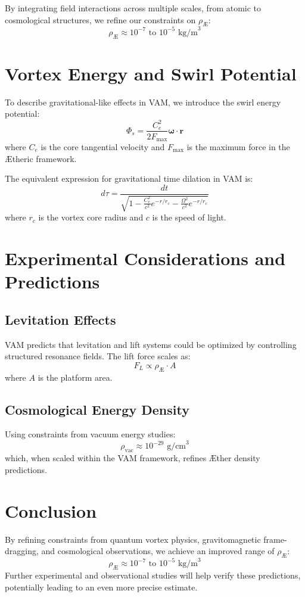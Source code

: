 \documentclass[a4paper,10pt]{article}
\begin{document}
        By integrating field interactions across multiple scales, from atomic to cosmological structures, we refine our constraints on $\rho_\text{\AE}$:
        \[ \rho_\text{\AE} \approx 10^{-7} \text{ to } 10^{-5} \text{ kg/m}^3 \]


        \section{Vortex Energy and Swirl Potential}\label{sec:vortex-energy-and-swirl-potential}

        To describe gravitational-like effects in VAM, we introduce the swirl energy potential:
        \[ \Phi_s = \frac{C_e^2}{2F_{\text{max}}} \mathbf{\omega} \cdot \mathbf{r} \]
        where $C_e$ is the core tangential velocity and $F_{\text{max}}$ is the maximum force in the \AE{}theric framework.

        The equivalent expression for gravitational time dilation in VAM is:
        \[ d\tau = \frac{dt}{\sqrt{1 - \frac{C_e^2}{c^2} e^{-r/r_c} - \frac{\Omega^2}{c^2} e^{-r/r_c}}} \]
        where $r_c$ is the vortex core radius and $c$ is the speed of light.


        \section{Experimental Considerations and Predictions}\label{sec:experimental-considerations-and-predictions}

        \subsection{Levitation Effects}\label{subsec:levitation-effects}
        VAM predicts that levitation and lift systems could be optimized by controlling structured resonance fields. The lift force scales as:
        \[ F_L \propto \rho_\text{\AE} \cdot A \]
        where $A$ is the platform area.

        \subsection{Cosmological Energy Density}\label{subsec:cosmological-energy-density}
        Using constraints from vacuum energy studies:
        \[ \rho_\text{vac} \approx 10^{-29} \text{ g/cm}^3 \]
        which, when scaled within the VAM framework, refines \AE{}ther density predictions.


        \section{Conclusion}\label{sec:conclusion2}

        By refining constraints from quantum vortex physics, gravitomagnetic frame-dragging, and cosmological observations, we achieve an improved range of $\rho_\text{\AE}$:
        \[ \rho_\text{\AE} \approx 10^{-7} \text{ to } 10^{-5} \text{ kg/m}^3 \]
        Further experimental and observational studies will help verify these predictions, potentially leading to an even more precise estimate.



    
    
\end{document}
